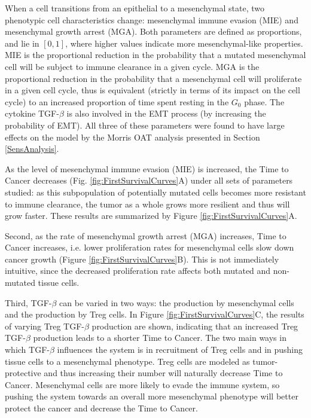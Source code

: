 \documentclass[11pt]{article}
\begin{document}
When a cell transitions from an epithelial to a mesenchymal state, two phenotypic cell characteristics change: mesenchymal immune evasion (MIE) and mesenchymal growth arrest (MGA).
Both parameters are defined as proportions, and lie in $[0,1]$, where higher values indicate more mesenchymal-like properties.
MIE is the proportional reduction in the probability that a mutated mesenchymal cell will be subject to immune clearance in a given cycle.
MGA is the proportional reduction in the probability that a mesenchymal cell will proliferate in a given cell cycle, thus is equivalent (strictly in terms of its impact on the cell cycle) to an increased proportion of time spent resting in the $G_0$ phase.
The cytokine TGF-$\beta$ is also involved in the EMT process (by increasing the probability of EMT). All three of these parameters were found to have large effects on the model by the Morris OAT analysis presented in Section \ref{SensAnalysis}.
\par 
As the level of mesenchymal immune evasion (MIE) is increased, the Time to Cancer decreases (Fig. \ref{fig:FirstSurvivalCurves}A) under all sets of parameters studied: as this subpopulation of potentially mutated cells becomes more resistant to immune clearance, the tumor as a whole grows more resilient and thus will grow faster.
These results are summarized by Figure \ref{fig:FirstSurvivalCurves}A.

Second, as the rate of mesenchymal growth arrest (MGA) increases, Time to Cancer increases, i.e. lower proliferation rates for mesenchymal cells slow down cancer growth (Figure \ref{fig:FirstSurvivalCurves}B).
This is not immediately intuitive, since the decreased proliferation rate affects both mutated and non-mutated tissue cells.

Third, TGF-$\beta$ can be varied in two ways: the production by mesenchymal cells and the production by Treg cells.
In Figure \ref{fig:FirstSurvivalCurves}C, the results of varying Treg TGF-$\beta$ production are shown, indicating that an increased Treg TGF-$\beta$ production leads to a shorter Time to Cancer.
The two main ways in which TGF-$\beta$ influences the system is in recruitment of Treg cells and in pushing tissue cells to a mesenchymal phenotype.
Treg cells are modeled as tumor-protective and thus increasing their number will naturally decrease Time to Cancer.
Mesenchymal cells are more likely to evade the immune system, so pushing the system towards an overall more mesenchymal phenotype will better protect the cancer and decrease the Time to Cancer.
\end{document}
